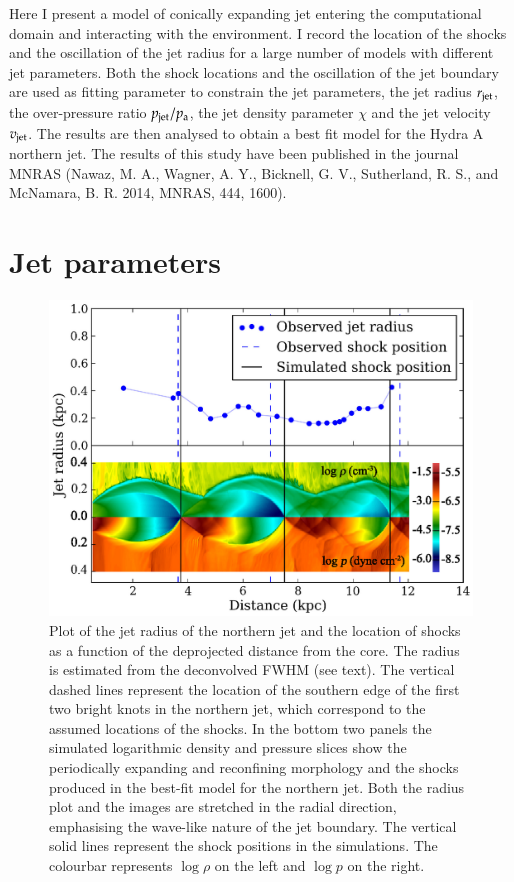 Here I present a model of conically expanding jet entering the computational domain and interacting with the environment. I record the location of the shocks and the oscillation of the jet radius for a large number of models with different jet parameters. Both the shock locations and the oscillation of the jet boundary are used as fitting parameter to constrain the jet parameters, the jet radius $r_{\rm jet}$, the over-pressure ratio $p_{\rm jet}/p_{\rm a}$, the jet density parameter $\chi$ and the jet velocity $v_{\rm jet}$. The results are then analysed to obtain a best fit model for the Hydra A northern jet. The results of this study have been published in the journal MNRAS (Nawaz, M. A., Wagner, A. Y., Bicknell, G. V., Sutherland, R. S., and McNamara, B. R. 2014, MNRAS, 444, 1600).



%
%
\section{Jet parameters} \label{s:model}


 
\begin{figure}
\includegraphics[width=\linewidth]{crp.eps}
\caption{Plot of the jet radius of the northern jet and the location of shocks as a function of the deprojected distance from the core. The radius is estimated from the deconvolved FWHM (see text). The vertical dashed lines represent the location of the southern edge of the first two bright knots in the northern jet, which correspond to the assumed locations of the shocks. In the bottom two panels the simulated logarithmic density and pressure slices show the periodically expanding and reconfining morphology and the shocks produced in the best-fit model for the northern jet. Both the radius plot and the images are stretched in the radial direction, emphasising the wave-like nature of the jet boundary. The vertical solid lines represent the shock positions in the simulations. The colourbar represents $\log \rho$ on the left and $\log p$ on the right.}
\label{f:radius}
\end{figure}


